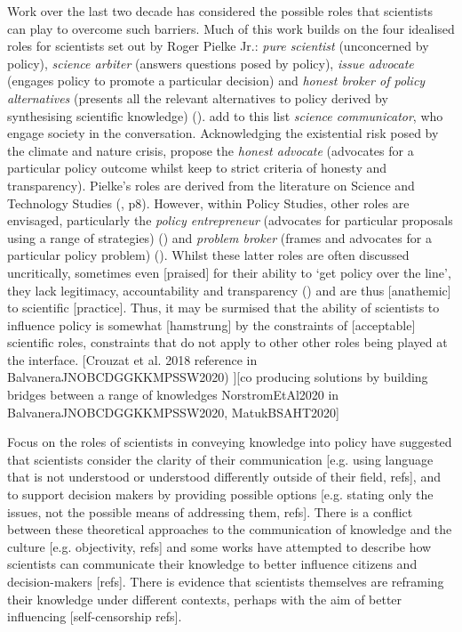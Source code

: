 Work over the last two decade has considered the possible roles that scientists can play to overcome such barriers. Much of this work builds on the four idealised roles for scientists set out by Roger Pielke Jr.: \emph{pure scientist} (unconcerned by policy), \emph{science arbiter} (answers questions posed by policy), \emph{issue advocate} (engages policy to promote a particular decision) and \emph{honest broker of policy alternatives} (presents all the relevant alternatives to policy derived by synthesising scientific knowledge) (\cite{Pielke2007}). \textcite{RapleyD2014} add to this list \emph{science communicator}, who engage society in the conversation. Acknowledging the existential risk posed by the climate and nature crisis, \textcite{GregoryBW2024} propose the \emph{honest advocate} (advocates for a particular policy outcome whilst keep to strict criteria of honesty and transparency).  Pielke's roles are derived from the literature on Science and Technology Studies (\cite{Pielke2007}, p8). However, within Policy Studies, other roles are envisaged, particularly the \emph{policy entrepreneur} (advocates for particular proposals using a range of strategies) (\cite{Kingdon1993,Cairney2018}) and \emph{problem broker} (frames and advocates for a particular policy problem) (\cite{Knaggard2015}). Whilst these latter roles are often discussed uncritically, sometimes even [praised] for their ability to `get policy over the line', they lack legitimacy, accountability and transparency (\cite{vonMalmborg2024strategies}) and are thus [anathemic] to scientific [practice]. Thus, it may be surmised that the ability of scientists to influence policy is somewhat [hamstrung] by the constraints of [acceptable] scientific roles, constraints that do not apply to other other roles being played at the interface. [Crouzat et al. 2018 reference in BalvaneraJNOBCDGGKKMPSSW2020) ][co producing solutions by building bridges between a range of knowledges NorstromEtAl2020 in BalvaneraJNOBCDGGKKMPSSW2020, MatukBSAHT2020]


Focus on the roles of scientists in conveying knowledge into policy have suggested that scientists consider the clarity of their communication [e.g. using language that is not understood or understood differently outside of their field, refs], and to support decision makers by providing possible options [e.g. stating only the issues, not the possible means of addressing them, refs]. There is a conflict between these theoretical approaches to the communication of knowledge and the culture [e.g. objectivity, refs] and some works have attempted to describe how scientists can communicate their knowledge to better influence citizens and decision-makers [refs]. There is evidence that scientists themselves are reframing their knowledge under different contexts, perhaps with the aim of better influencing [self-censorship refs].

